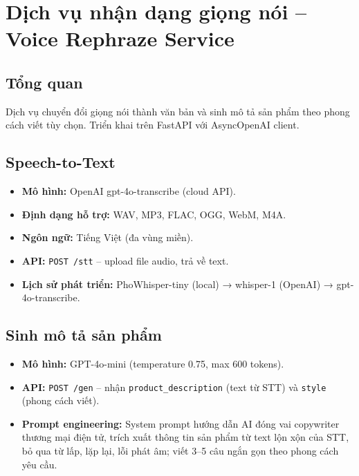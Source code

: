 \section{Dịch vụ nhận dạng giọng nói -- Voice Rephraze Service}

\subsection{Tổng quan}

Dịch vụ chuyển đổi giọng nói thành văn bản và sinh mô tả sản phẩm theo
phong cách viết tùy chọn. Triển khai trên FastAPI với AsyncOpenAI client.

\subsection{Speech-to-Text}

\begin{itemize}
\item \textbf{Mô hình:} OpenAI gpt-4o-transcribe (cloud API).
\item \textbf{Định dạng hỗ trợ:} WAV, MP3, FLAC, OGG, WebM, M4A.
\item \textbf{Ngôn ngữ:} Tiếng Việt (đa vùng miền).
\item \textbf{API:} \texttt{POST /stt} -- upload file audio, trả về text.
\item \textbf{Lịch sử phát triển:} PhoWhisper-tiny (local) → whisper-1 (OpenAI) → gpt-4o-transcribe.
\end{itemize}

\subsection{Sinh mô tả sản phẩm}

\begin{itemize}
\item \textbf{Mô hình:} GPT-4o-mini (temperature 0.75, max 600 tokens).
\item \textbf{API:} \texttt{POST /gen} -- nhận \texttt{product\_description} (text từ STT)
  và \texttt{style} (phong cách viết).
\item \textbf{Prompt engineering:} System prompt hướng dẫn AI đóng vai copywriter
  thương mại điện tử, trích xuất thông tin sản phẩm từ text lộn xộn của STT,
  bỏ qua từ lấp, lặp lại, lỗi phát âm; viết 3--5 câu ngắn gọn theo phong cách yêu cầu.
\end{itemize}

